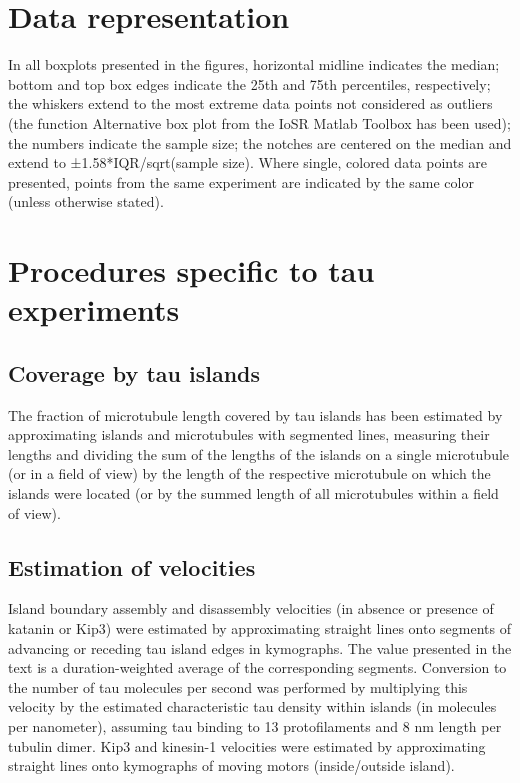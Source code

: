 \section{Data representation}
In all boxplots presented in the figures, horizontal midline indicates the median; bottom and top box edges indicate the 25th and 75th percentiles, respectively; the whiskers extend to the most extreme data points not considered as outliers (the function Alternative box plot from the IoSR Matlab Toolbox has been used); the numbers indicate the sample size; the notches are centered on the median and extend to ±1.58*IQR/sqrt(sample size). Where single, colored data points are presented, points from the same experiment are indicated by the same color (unless otherwise stated). 

\section{Procedures specific to tau experiments}
\subsection{Coverage by tau islands}
The fraction of microtubule length covered by tau islands has been estimated by approximating islands and microtubules with segmented lines, measuring their lengths and dividing the sum of the lengths of the islands on a single microtubule (or in a field of view) by the length of the respective microtubule on which the islands were located (or by the summed length of all microtubules within a field of view).

\subsection{Estimation of velocities}
Island boundary assembly and disassembly velocities (in absence or presence of katanin or Kip3) were estimated by approximating straight lines onto segments of advancing or receding tau island edges in kymographs. The value presented in the text is a duration-weighted average of the corresponding segments. Conversion to the number of tau molecules per second was performed by multiplying this velocity by the estimated characteristic tau density within islands (in molecules per nanometer), assuming tau binding to 13 protofilaments and 8 nm length per tubulin dimer. Kip3 and kinesin-1 velocities were estimated by approximating straight lines onto kymographs of moving motors (inside/outside island). 

